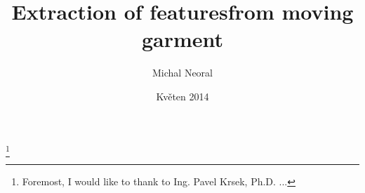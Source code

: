 
\def\mind#1{\Red{\bf#1}\Black}
\def\dopln{\mind{DOPLŇ~ODKAZ!}}
\def\task#1{\Green{#1}\Black}
\def\lorem{\mind{Lorem ipsum dolor sit amet, consectetur adipiscing elit. Curabitur arcu dolor, congue sit amet pellentesque vitae, semper ac ligula. Nam eu elit erat. Phasellus pretium at tellus sed commodo. Quisque auctor metus eu diam pretium pulvinar. Curabitur posuere ligula sed dapibus aliquet. Sed aliquet malesuada felis, vel aliquam lacus laoreet non. Pellentesque in tristique erat. Ut mollis consequat interdum. Integer orci velit, venenatis sed ligula et, pretium dapibus sem. Nam rhoncus urna sed urna volutpat congue. Ut suscipit ipsum vel.}}
\def\newbeg{}
\def\newend{}



\worktype [B/EN]
\title      {Extraction of features\nl from moving garment}
\author     {Michal Neoral}
\date       {Květen 2014}

\pagetwo    {}  %


\thanks {           %
   Foremost, I would like to thank to Ing. Pavel Krsek, Ph.D. ...

}


